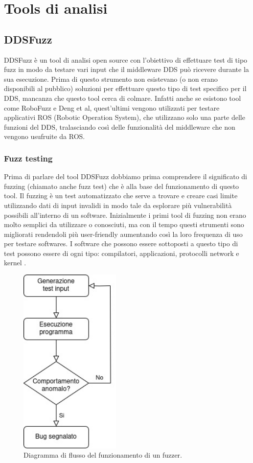 \chapter{Tools di analisi}
\section{DDSFuzz}
DDSFuzz è un tool di analisi open source con l'obiettivo di 
effettuare test di tipo fuzz
in modo da testare vari input che il middleware DDS può
ricevere durante la sua esecuzione. Prima di questo strumento 
non esistevano (o non erano disponibili al pubblico) soluzioni
per effettuare questo tipo di test specifico per il DDS, mancanza
che questo tool cerca di colmare. Infatti anche se esistono tool 
come RoboFuzz e Deng et al, quest'ultimi vengono utilizzati 
per testare applicativi ROS (Robotic Operation System), che 
utilizzano solo una parte delle funzioni del DDS, tralasciando
così delle funzionalità del middleware che non vengono usufruite
da ROS.


\subsection{Fuzz testing}
Prima di parlare del tool DDSFuzz dobbiamo prima comprendere 
il significato di fuzzing (chiamato anche fuzz test) che è
alla base del funzionamento di questo tool. Il fuzzing è un test
automatizzato che serve a trovare e creare casi limite utilizzando
dati di input invalidi in modo tale da esplorare più vulnerabilità
possibili all'interno di un software. 
Inizialmente i primi tool di fuzzing non erano molto 
semplici da utilizzare o conosciuti, ma con il tempo questi strumenti
sono migliorati rendendoli più user-friendly aumentando così la 
loro frequenza di uso per testare softwares. I software che possono 
essere sottoposti a questo tipo di test possono essere 
di ogni tipo: compilatori, applicazioni, protocolli network 
e kernel \cite{8371326}.

\begin{figure}[H]
    \centering
    \includegraphics[width=5cm, keepaspectratio]{img/Diagramma di flusso fuzzer.jpg}
    \caption{Diagramma di flusso del funzionamento di un fuzzer.}
    \label{funzionamento fuzzer}
\end{figure}

